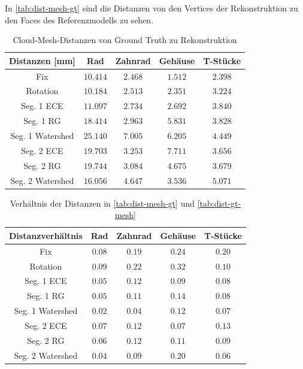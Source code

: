In \autoref{tab:dist-mesh-gt} sind die Distanzen von den Vertices der Rekonstruktion zu den Faces des Referenzmodells zu sehen.


\begin{table}[H]
	\centering
	\begin{tabular}{| c || c | c | c | c |}
		\hline
		\textbf{Distanzen [mm]} & Rad & Zahnrad & Gehäuse & T-Stücke\\
		\hline\hline
		Fix & $10.414$ & $2.468$ & $1.512$ & $2.398$\\
		\hline
		Rotation & $10.184$ & $2.513$ & $2.351$ & $3.224$\\
		\hline
		Seg. 1 \ac{ECE} & $11.097$ & $2.734$ & $2.692$ & $3.840$\\
		\hline
		Seg. 1 \ac{RG} & $18.414$ & $2.963$ & $5.831$ & $3.828$\\
		\hline
		Seg. 1 Watershed & $25.140$ & $7.005$ & $6.205$ & $4.449$\\
		\hline
		Seg. 2 \ac{ECE} & $19.703$ & $3.253$ & $7.711$ & $3.656$\\
		\hline
		Seg. 2 \ac{RG} & $19.744$ & $3.084$ & $4.675$ & $3.679$ \\
		\hline
		Seg. 2 Watershed & $16.056$ & $4.647$ & $3.536$ & $5.071$\\
		\hline
	\end{tabular}
	\caption{Cloud-Mesh-Distanzen von Ground Truth zu Rekonstruktion}
	\label{tab:dist-gt-mesh}
\end{table}

\begin{table}[H]
	\centering
	\begin{tabular}{| c || c | c | c | c |}
		\hline
		\textbf{Distanzverhältnis} & Rad & Zahnrad & Gehäuse & T-Stücke\\
		\hline\hline
		Fix & $0.08$ & $0.19$ & $0.24$ & $0.20$\\
		\hline
		Rotation & $0.09$ & $0.22$ & $0.32$ & $0.10$\\
		\hline
		Seg. 1 \ac{ECE} & $0.05$ & $0.12$ & $0.09$ & $0.08$\\
		\hline
		Seg. 1 \ac{RG} & $0.05$ & $0.11$ & $0.14$ & $0.08$\\
		\hline
		Seg. 1 Watershed & $0.02$ & $0.04$ & $0.12$ & $0.07$\\
		\hline
		Seg. 2 \ac{ECE} & $0.07$ & $0.12$ & $0.07$ & $0.13$\\
		\hline
		Seg. 2 \ac{RG} & $0.06$ & $0.12$ & $0.11$ & $0.09$\\
		\hline
		Seg. 2 Watershed & $0.04$ & $0.09$ & $0.20$ & $0.06$\\
		\hline
	\end{tabular}
	\caption{Verhältnis der Distanzen in \autoref{tab:dist-mesh-gt} und \autoref{tab:dist-gt-mesh}}
	\label{tab:dist-verhältnis}
\end{table}

